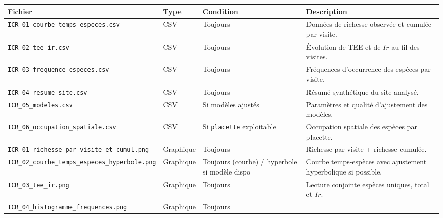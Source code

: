 {\def\LTcaptype{none} %
\begin{longtable}[]{@{}
  >{\raggedright\arraybackslash}p{}
  >{\raggedright\arraybackslash}p{}
  >{\raggedright\arraybackslash}p{}
  >{\raggedright\arraybackslash}p{}@{}}
\toprule\noalign{}
\begin{minipage}[b]{\linewidth}\raggedright
Fichier
\end{minipage} & \begin{minipage}[b]{\linewidth}\raggedright
Type
\end{minipage} & \begin{minipage}[b]{\linewidth}\raggedright
Condition
\end{minipage} & \begin{minipage}[b]{\linewidth}\raggedright
Description
\end{minipage} \\
\midrule\noalign{}
\endhead
\bottomrule\noalign{}
\endlastfoot
\texttt{ICR\_01\_courbe\_temps\_especes.csv} & CSV & Toujours & Données
de richesse observée et cumulée par visite. \\
\texttt{ICR\_02\_tee\_ir.csv} & CSV & Toujours & Évolution de TEE et de
\(Ir\) au fil des visites. \\
\texttt{ICR\_03\_frequence\_especes.csv} & CSV & Toujours & Fréquences
d'occurrence des espèces par visite. \\
\texttt{ICR\_04\_resume\_site.csv} & CSV & Toujours & Résumé synthétique
du site analysé. \\
\texttt{ICR\_05\_modeles.csv} & CSV & Si modèles ajustés & Paramètres et
qualité d'ajustement des modèles. \\
\texttt{ICR\_06\_occupation\_spatiale.csv} & CSV & Si \texttt{placette}
exploitable & Occupation spatiale des espèces par placette. \\
\texttt{ICR\_01\_richesse\_par\_visite\_et\_cumul.png} & Graphique &
Toujours & Richesse par visite + richesse cumulée. \\
\texttt{ICR\_02\_courbe\_temps\_especes\_hyperbole.png} & Graphique &
Toujours (courbe) / hyperbole si modèle dispo & Courbe temps-espèces
avec ajustement hyperbolique si possible. \\
\texttt{ICR\_03\_tee\_ir.png} & Graphique & Toujours & Lecture conjointe
espèces uniques, total et \(Ir\). \\
\texttt{ICR\_04\_histogramme\_frequences.png} & Graphique & Toujours &

\end{longtable}}
